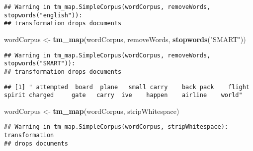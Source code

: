 \documentclass[
]{article}
\newenvironment{Shaded}{\begin{snugshade}}{\end{snugshade}}
\newcommand{\DecValTok}[1]{\textcolor[rgb]{0.00,0.00,0.81}{#1}}
\newcommand{\FunctionTok}[1]{\textcolor[rgb]{0.13,0.29,0.53}{\textbf{#1}}}
\newcommand{\NormalTok}[1]{#1}
\newcommand{\OtherTok}[1]{\textcolor[rgb]{0.56,0.35,0.01}{#1}}
\newcommand{\SpecialCharTok}[1]{\textcolor[rgb]{0.81,0.36,0.00}{\textbf{#1}}}
\newcommand{\StringTok}[1]{\textcolor[rgb]{0.31,0.60,0.02}{#1}}
\begin{document}
\begin{verbatim}
## Warning in tm_map.SimpleCorpus(wordCorpus, removeWords, stopwords("english")):
## transformation drops documents
\end{verbatim}

\begin{Shaded}
\begin{Highlighting}[]
\NormalTok{wordCorpus }\OtherTok{\textless{}{-}} \FunctionTok{tm\_map}\NormalTok{(wordCorpus, removeWords, }\FunctionTok{stopwords}\NormalTok{(}\StringTok{"SMART"}\NormalTok{))}
\end{Highlighting}
\end{Shaded}

\begin{verbatim}
## Warning in tm_map.SimpleCorpus(wordCorpus, removeWords, stopwords("SMART")):
## transformation drops documents
\end{verbatim}

\begin{Shaded}
\end{Shaded}

\begin{verbatim}
## [1] " attempted  board  plane   small carry    back pack    flight   spirit charged     gate   carry  ive    happen    airline    world"
\end{verbatim}

\begin{Shaded}
\begin{Highlighting}[]
\NormalTok{wordCorpus }\OtherTok{\textless{}{-}} \FunctionTok{tm\_map}\NormalTok{(wordCorpus, stripWhitespace)}
\end{Highlighting}
\end{Shaded}

\begin{verbatim}
## Warning in tm_map.SimpleCorpus(wordCorpus, stripWhitespace): transformation
## drops documents
\end{verbatim}

\begin{Shaded}
\end{Shaded}
\end{document}
